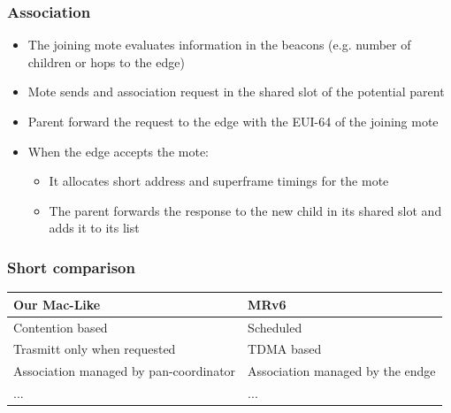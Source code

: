 \begin{frame}[fragile]
  \frametitle{Association}
  \begin{itemize}
    \item The joining mote evaluates information in the beacons (e.g. number of children or hops to the edge)
    \item Mote sends and association request in the shared slot of the potential parent
    \item Parent forward the request to the edge with the EUI-64 of the joining mote
    \item When the edge accepts the mote:
    \begin{itemize}
      \item It allocates short address and superframe timings for the mote
      \item The parent forwards the response to the new child in its shared slot and adds it to its list
    \end{itemize}
  \end{itemize}
\end{frame}

\begin{frame}[fragile]
 \frametitle{Short comparison}
 \begin{table}[h]
    \begin{tabular}{@{}p{5cm}p{5cm}@{}}
      \toprule
      Our Mac-Like &  MRv6 \\ \midrule
      Contention based &  Scheduled\\
      Trasmitt only when  \mbox{requested} &  TDMA based\\
      Association managed by pan-coordinator & Association managed by the endge  \\ 
      ... & ... \\ \bottomrule
    \end{tabular}
  \end{table}
\end{frame}
